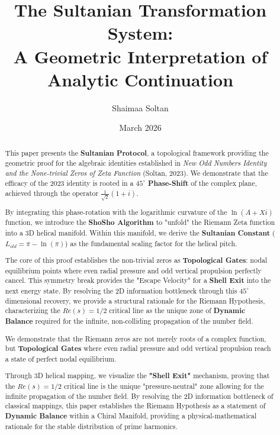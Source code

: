 \documentclass[11pt,a4paper]{article}
\title{The Sultanian Transformation System: \\ A Geometric Interpretation of Analytic Continuation}
\author{Shaimaa Soltan}
\date{March 2026}
\begin{document}
\maketitle

\begin{abstract}
This paper presents the \textbf{Sultanian Protocol}, a topological framework providing the geometric proof for the algebraic identities established in \textit{New Odd Numbers Identity and the None-trivial Zeros of Zeta Function} (Soltan, 2023). We demonstrate that the efficacy of the 2023 identity is rooted in a \textbf{$45^\circ$ Phase-Shift} of the complex plane, achieved through the operator $\frac{1}{\sqrt{2}}(1+i)$. 

By integrating this phase-rotation with the logarithmic curvature of the $\ln(A+Xi)$ function, we introduce the \textbf{ShoSho Algorithm} to "unfold" the Riemann Zeta function into a 3D helical manifold. Within this manifold, we derive the \textbf{Sultanian Constant} ($L_{old} = \pi - \ln(\pi)$) as the fundamental scaling factor for the helical pitch. 

The core of this proof establishes the non-trivial zeros as \textbf{Topological Gates}: nodal equilibrium points where even radial pressure and odd vertical propulsion perfectly cancel. This symmetry break provides the "Escape Velocity" for a \textbf{Shell Exit} into the next energy state. By resolving the 2D information bottleneck through this $45^\circ$ dimensional recovery, we provide a structural rationale for the Riemann Hypothesis, characterizing the $Re(s)=1/2$ critical line as the unique zone of \textbf{Dynamic Balance} required for the infinite, non-colliding propagation of the number field.

We demonstrate that the Riemann zeros are not merely roots of a complex function, but \textbf{Topological Gates} where even radial pressure and odd vertical propulsion reach a state of perfect nodal equilibrium. 

Through 3D helical mapping, we visualize the \textbf{"Shell Exit"} mechanism, proving that the $Re(s)=1/2$ critical line is the unique "pressure-neutral" zone allowing for the infinite propagation of the number field. By resolving the 2D information bottleneck of classical mappings, this paper establishes the Riemann Hypothesis as a statement of \textbf{Dynamic Balance} within a Chiral Manifold, providing a physical-mathematical rationale for the stable distribution of prime harmonics.
\end{abstract}
\end{document}
